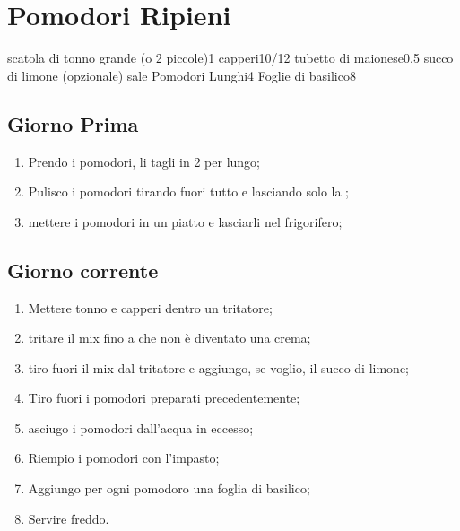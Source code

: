 \section{Pomodori Ripieni}

\generalRecipeInfos{}

\ingredienti%
    {scatola di tonno grande (o 2 piccole)}{1}%
    {capperi}{10/12}%
    {tubetto di maionese}{0.5}%
    {succo di limone (opzionale)}{\qb{}}%
    {sale}{\qb{}}%
    {Pomodori Lunghi}{4}%
    {Foglie di basilico}{8}%


\subsection{Giorno Prima}
\begin{enumerate}
    \item Prendo i pomodori, li tagli in 2 per lungo;
    \item Pulisco i pomodori tirando fuori tutto e lasciando solo la ;
    \item mettere i pomodori in un piatto e lasciarli nel frigorifero;
\end{enumerate}


\subsection{Giorno corrente}
\begin{enumerate}
    \item Mettere tonno e capperi dentro un tritatore;
    \item tritare il mix fino a che non è diventato una crema;
    \item tiro fuori il mix dal tritatore e aggiungo, se voglio, il succo di limone;
    \item Tiro fuori i pomodori preparati precedentemente;
    \item asciugo i pomodori dall'acqua in eccesso;
    \item Riempio i pomodori con l'impasto;
    \item Aggiungo per ogni pomodoro una foglia di basilico;
    \item Servire freddo.
\end{enumerate}